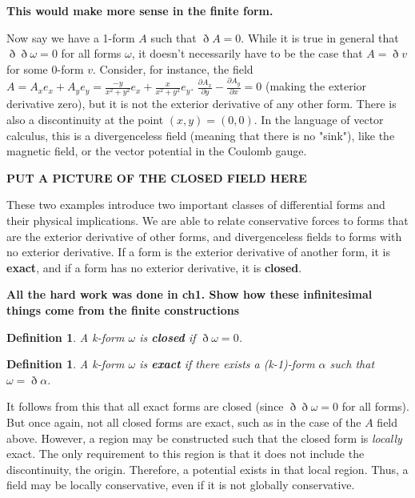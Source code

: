 \documentclass{book}
\newtheorem{defn}[equation]{Definition}
\begin{document}
\textbf{This would make more sense in the finite form.}

Now say we have a 1-form $A$ such that $\eth A = 0.$ While it is true in general that $\eth\eth\omega = 0$ for all forms $\omega$, it doesn't necessarily have to be the case that $A = \eth v$ for some 0-form $v.$ Consider, for instance, the field $A = A_x e_x + A_y e_y = \frac{-y}{x^2 + y^2} e_x + \frac{x}{x^2 + y^2} e_y$. $\frac{\partial A_x}{\partial y} - \frac{\partial A_y}{\partial x} = 0$ (making the exterior derivative zero), but it is not the exterior derivative of any other form. There is also a discontinuity at the point $(x,y) = (0,0)$. In the language of vector calculus, this is a divergenceless field (meaning that there is no "sink"), like the magnetic field, or the vector potential in the Coulomb gauge.  

\textbf{PUT A PICTURE OF THE CLOSED FIELD HERE}

These two examples introduce two important classes of differential forms and their physical implications. We are able to relate conservative forces to forms that are the exterior derivative of other forms, and divergenceless fields to forms with no exterior derivative. If a form is the exterior derivative of another form, it is \textbf{exact}, and if a form has no exterior derivative, it is \textbf{closed}.
 
 \textbf{All the hard work was done in ch1. Show how these infinitesimal things come from the finite constructions}
 
\begin{defn} 
	A k-form \textbf{$\omega$} is \textbf{closed} if $\eth\omega = 0$. 
\end{defn}

\begin{defn} 
	A k-form \textbf{$\omega$} is \textbf{exact} if there exists a (k-1)-form $\alpha$ such that $\omega = \eth\alpha$.
\end{defn}



It follows from this that all exact forms are closed (since $\eth\eth\omega = 0$ for all forms). But once again, not all closed forms are exact, such as in the case of the $A$ field above. However, a region may be constructed such that the closed form is \emph{locally} exact. The only requirement to this region is that it does not include the discontinuity, the origin. Therefore, a potential exists in that local region. Thus, a field may be locally conservative, even if it is not globally conservative. 
\end{document}
